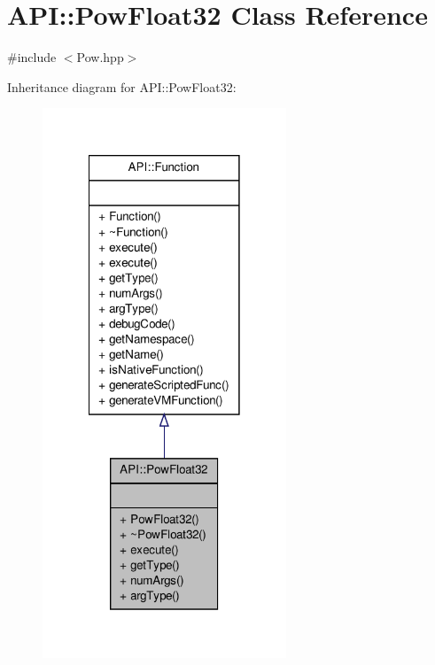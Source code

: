\hypertarget{class_a_p_i_1_1_pow_float32}{\section{A\-P\-I\-:\-:Pow\-Float32 Class Reference}
\label{class_a_p_i_1_1_pow_float32}
}


{\ttfamily \#include $<$Pow.\-hpp$>$}



Inheritance diagram for A\-P\-I\-:\-:Pow\-Float32\-:
\nopagebreak
\begin{figure}[H]
\begin{center}
\leavevmode
\includegraphics[width=206pt]{class_a_p_i_1_1_pow_float32__inherit__graph}
\end{center}
\end{figure}


